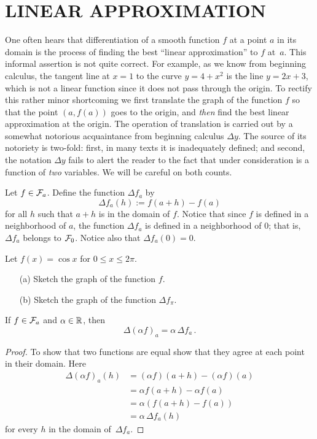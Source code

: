 \section{LINEAR APPROXIMATION}
One often hears that differentiation of a smooth function $f$ at a point $a$ in its domain is
the process of finding the best ``linear approximation'' to $f$ at~$a$. This informal
assertion is not quite correct. For example, as we know from beginning calculus, the tangent
line at $x=1$ to the curve $y = 4 + x^2$ is the line $y = 2x + 3$, which is not a linear
function since it does not pass through the origin. To rectify this rather minor shortcoming
we first translate the graph of the function $f$ so that the point $(a,f(a))$ goes to the
origin, and \emph{then} find the best linear approximation at the origin. The operation of
translation is carried out by a somewhat notorious acquaintance from beginning calculus
$\Delta y$. The source of its notoriety is two-fold: first, in many texts it is inadequately
defined; and second, the notation $\Delta y$ fails to alert the reader to the fact that under
consideration is a function of \emph{two} variables. We will be careful on both counts.

\begin{defn}\label{Delta} Let $f \in \mathcal{F}_a$. Define the function
$\Delta f_a$ by
  \[ \Delta f_a(h) := f(a + h) - f(a) \]
for all $h$ such that $a + h$ is in the domain of $f$. Notice that since $f$ is defined in a
neighborhood of $a$, the function $\Delta f_a$ is defined in a neighborhood of 0; that is,
$\Delta f_a$ belongs to $\mathcal{F}_0$. Notice also that $\Delta f_a(0) = 0$.
\end{defn}

\begin{prob} Let $f(x) = \cos x$ for $0 \le x \le 2\pi$.
 \begin{enumerate}
  \item[(a)] Sketch the graph of the function $f$.
  \item[(b)] Sketch the graph of the function $\Delta f_{\pi}$.
 \end{enumerate}
\end{prob}

\begin{prop}\label{del_sm} If $f \in \mathcal{F}_a$ and $\alpha \in \mathbb{R}$, then
   \[ \Delta(\alpha f)_a = \alpha\,\Delta f_a\,. \]
\end{prop}

\begin{proof} To show that two functions are equal show that they agree at each point in their
domain.  Here
 \begin{align*}
     \Delta(\alpha f)_a(h) &= (\alpha f)(a + h) - (\alpha f)(a) \\
                           &= \alpha f(a + h) - \alpha f(a) \\
                           &= \alpha(f(a + h) - f(a)) \\
                           &= \alpha\,\Delta f_a(h)
 \end{align*}
for every $h$ in the domain of~$\Delta f_a$.
\end{proof}

